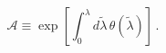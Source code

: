 \begin{equation}
\mathcal{A} \equiv \exp \left[ \int_0^\lambda d\tilde{\lambda}
\, \theta(\tilde{\lambda}) \right]\, .
\end{equation}

